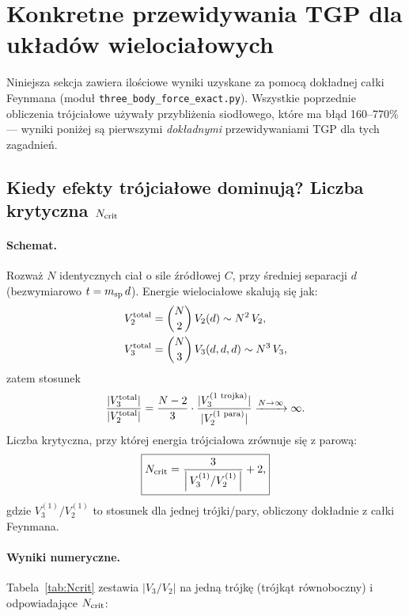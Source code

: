 
\section{Konkretne przewidywania TGP dla układów wielociałowych}

Niniejsza sekcja zawiera ilościowe wyniki uzyskane za pomocą
dokładnej całki Feynmana (moduł \texttt{three\_body\_force\_exact.py}).
Wszystkie poprzednie obliczenia trójciałowe używały przybliżenia
siodłowego, które ma błąd 160--770\% — wyniki poniżej są pierwszymi
\emph{dokładnymi} przewidywaniami TGP dla tych zagadnień.

\subsection{Kiedy efekty trójciałowe dominują? Liczba krytyczna \texorpdfstring{$N_{\rm crit}$}{N\_crit}}

\paragraph{Schemat.}
Rozważ $N$ identycznych ciał o sile źródłowej $C$, przy średniej
separacji $d$ (bezwymiarowo $t = m_{\rm sp}\,d$).
Energie wielociałowe skalują się jak:
\begin{align}
V_2^{\rm total} &= \binom{N}{2}\,V_2(d) \sim N^2\,V_2,\\
V_3^{\rm total} &= \binom{N}{3}\,V_3(d,d,d) \sim N^3\,V_3,
\end{align}
zatem stosunek
\begin{equation}
\frac{|V_3^{\rm total}|}{|V_2^{\rm total}|}
= \frac{N-2}{3}\cdot\frac{|V_3^{(1\text{ trojka})}|}{|V_2^{(1\text{ para})}|}
\xrightarrow{N\to\infty} \infty.
\end{equation}
Liczba krytyczna, przy której energia trójciałowa zrównuje się z parową:
\begin{equation}
\boxed{
N_{\rm crit} = \frac{3}{\left|\,V_3^{(1)}/V_2^{(1)}\,\right|} + 2,
}
\end{equation}
gdzie $V_3^{(1)}/V_2^{(1)}$ to stosunek dla jednej trójki/pary, obliczony
dokładnie z całki Feynmana.

\paragraph{Wyniki numeryczne.}
Tabela~\ref{tab:Ncrit} zestawia $|V_3/V_2|$ na jedną trójkę
(trójkąt równoboczny) i odpowiadające $N_{\rm crit}$:

